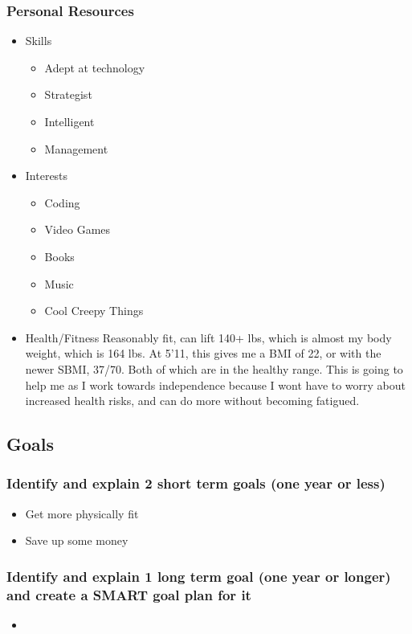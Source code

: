 \documentclass[11pt]{article}
\begin{document}
\subsubsection*{Personal Resources}
\label{sec:orgebf9764}
\begin{itemize}
\item Skills
\label{sec:org8b0e4c1}
\begin{itemize}
\item Adept at technology
\item Strategist
\item Intelligent
\item Management
\end{itemize}
\item Interests
\label{sec:org704a557}
\begin{itemize}
\item Coding
\item Video Games
\item Books
\item Music
\item Cool Creepy Things
\end{itemize}
\item Health/Fitness
\label{sec:org0e16f09}
Reasonably fit, can lift 140+ lbs, which is almost my body weight, which is 164 lbs. At 5'11, this gives me a BMI of 22, or with the newer SBMI, 37/70. Both of which are in the healthy range. This is going to help me as I work towards independence because I wont have to worry about increased health risks, and can do more without becoming fatigued.
\end{itemize}
\subsection*{Goals}
\label{sec:org9e8fe2d}
\subsubsection*{Identify and explain 2 short term goals (one year or less)}
\label{sec:org1fcc202}
\begin{itemize}
\item Get more physically fit
\label{sec:org0e961f6}
\item Save up some money
\label{sec:org35af02e}
\end{itemize}
\subsubsection*{Identify and explain 1 long term goal (one year or longer) and create a SMART goal plan for it}
\label{sec:org64bf688}
\begin{itemize}
\item 
\label{sec:org22283db}
\end{itemize}
\end{document}
